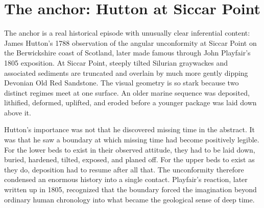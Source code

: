 \documentclass[11pt]{article}
\begin{document}
\maketitle
\begin{abstract}
Stratigraphy is often taught as a science of positive layers: beds accumulate, superposition orders them, and geological history is reconstructed from what remains. Unconformities then appear as regrettable interruptions in an otherwise continuous record. This essay argues, using Hutton's 1788 encounter with the angular unconformity at Siccar Point, Playfair's 1805 exposition, the Great Unconformity of the Grand Canyon and wider North American craton, and the tectonic machinery of orogeny and subduction, that such gaps are not merely absences. An unconformity is a legible boundary where stratigraphic \continuation\ became \inadmissible\ under prevailing conditions: uplift, tilting, erosion, metamorphism, or non-deposition prevented the direct persistence of a coherent depositional sequence. The later resumption of deposition is therefore not just ``more rock after missing rock.'' It is a \repair\ event in which a new sequence is admitted across a surface that encodes real information about elapsed time, deformation, exposure, and landscape history. The argument has limits: some paraconformities and poorly constrained hiatuses approach pure absence. But the history of geology itself suggests that the interpretive force of unconformities lies precisely in the fact that a gap can be more informative than another intact bed.
\end{abstract}

\section{The anchor: Hutton at Siccar Point}
The anchor is a real historical episode with unusually clear inferential content: James Hutton's 1788 observation of the angular unconformity at Siccar Point on the Berwickshire coast of Scotland, later made famous through John Playfair's 1805 exposition. At Siccar Point, steeply tilted Silurian graywackes and associated sediments are truncated and overlain by much more gently dipping Devonian Old Red Sandstone. The visual geometry is so stark because two distinct regimes meet at one surface. An older marine sequence was deposited, lithified, deformed, uplifted, and eroded before a younger package was laid down above it.

Hutton's importance was not that he discovered missing time in the abstract. It was that he saw a boundary at which missing time had become positively legible. For the lower beds to exist in their observed attitude, they had to be laid down, buried, hardened, tilted, exposed, and planed off. For the upper beds to exist as they do, deposition had to resume after all that. The unconformity therefore condensed an enormous history into a single contact. Playfair's reaction, later written up in 1805, recognized that the boundary forced the imagination beyond ordinary human chronology into what became the geological sense of deep time.
\end{document}
